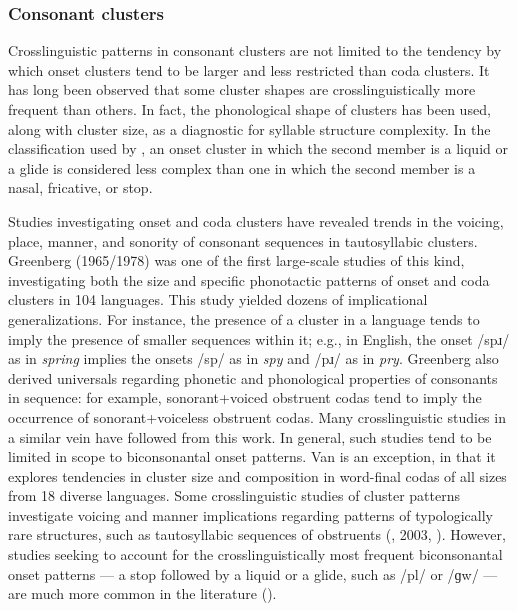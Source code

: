 \subsubsection{{Consonant} {clusters}}\label{sec:1.1.2.3}

  Crosslinguistic patterns in consonant clusters are not limited to the tendency by which onset clusters tend to be larger and less restricted than coda clusters. It has long been observed that some cluster shapes are crosslinguistically more frequent than others. In fact, the phonological shape of clusters has been used, along with cluster size, as a diagnostic for syllable structure complexity. In the classification used by \citet{Maddieson2013a}, an onset cluster in which the second member is a liquid or a glide is considered less complex than one in which the second member is a nasal, fricative, or stop.

  Studies investigating onset and coda clusters have revealed trends in the voicing, place, manner, and sonority of consonant sequences in tautosyllabic clusters. Greenberg (1965/1978) was one of the first large-scale studies of this kind, investigating both the size and specific phonotactic patterns of onset and coda clusters in 104 languages. This study yielded dozens of implicational generalizations. For instance, the presence of a cluster in a language tends to imply the presence of smaller sequences within it; e.g., in English, the onset /spɹ/ as in \textit{spring} implies the onsets /sp/ as in \textit{spy} and /pɹ/ as in \textit{pry}. Greenberg also derived universals regarding phonetic and phonological properties of consonants in sequence: for example, sonorant+voiced obstruent codas tend to imply the occurrence of sonorant+voiceless obstruent codas. Many crosslinguistic studies in a similar vein have followed from this work. In general, such studies tend to be limited in scope to biconsonantal onset patterns. Van\citet{Dam2004} is an exception, in that it explores tendencies in cluster size and composition in word-final codas of all sizes from 18 diverse languages. Some crosslinguistic studies of cluster patterns investigate voicing and manner implications regarding patterns of typologically rare structures, such as tautosyllabic sequences of obstruents (\citealt{Morelli1999}, 2003, \citealt{Kreitman2008}). However, studies seeking to account for the crosslinguistically most frequent biconsonantal onset patterns — a stop followed by a liquid or a glide, such as /pl/ or /ɡw/ — are much more common in the literature (\citealt{Clements1990,BerentEtAl2008,BerentEtAl2011,Parker2012,Vennemann2012}). 

